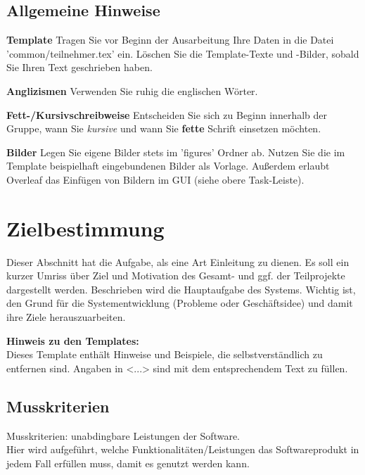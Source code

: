 \section{Allgemeine Hinweise}
\textbf{Template} Tragen Sie vor Beginn der Ausarbeitung Ihre Daten in die Datei 'common/teilnehmer.tex' ein. Löschen Sie die Template-Texte und -Bilder, sobald Sie Ihren Text geschrieben haben.

\textbf{Anglizismen} Verwenden Sie ruhig die englischen Wörter.

\textbf{Fett-/Kursivschreibweise} Entscheiden Sie sich zu Beginn innerhalb der Gruppe, wann Sie \textit{kursive} und wann Sie \textbf{fette} Schrift einsetzen möchten.

\textbf{Bilder} Legen Sie eigene Bilder stets im 'figures' Ordner ab. Nutzen Sie die im Template beispielhaft eingebundenen Bilder als Vorlage. Außerdem erlaubt Overleaf das Einfügen von Bildern im GUI (siehe obere Task-Leiste).


\chapter{Zielbestimmung}
\label{chap:target}
Dieser Abschnitt hat die Aufgabe, als eine Art Einleitung zu dienen. Es soll
ein kurzer Umriss über Ziel und Motivation des Gesamt- und ggf. der
Teilprojekte dargestellt werden. Beschrieben wird die Hauptaufgabe des Systems.
Wichtig ist, den Grund für die Systementwicklung (Probleme oder Geschäftsidee)
und damit ihre Ziele herauszuarbeiten.

\textbf{Hinweis zu den Templates:}\\
Dieses Template enthält Hinweise und Beispiele, die selbstverständlich zu entfernen sind. 
Angaben in <...> sind mit dem entsprechendem Text zu füllen.
\section{Musskriterien}\label{sec:musskriterien}
Musskriterien: unabdingbare Leistungen der Software. \\
Hier wird aufgeführt, welche Funktionalitäten/Leistungen das Softwareprodukt in
jedem Fall erfüllen muss, damit es genutzt werden kann.

